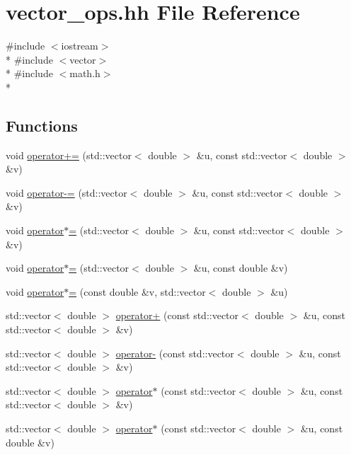 \hypertarget{vector__ops_8hh}{\section{vector\-\_\-ops.\-hh File Reference}
\label{vector__ops_8hh}
}
{\ttfamily \#include $<$iostream$>$}\\*
{\ttfamily \#include $<$vector$>$}\\*
{\ttfamily \#include $<$math.\-h$>$}\\*
\subsection*{Functions}
\begin{DoxyCompactItemize}
\item 
void \hyperlink{vector__ops_8hh_adbc42bb6b72e7c57f961c77a042a9bff}{operator+=} (std\-::vector$<$ double $>$ \&u, const std\-::vector$<$ double $>$ \&v)
\item 
void \hyperlink{vector__ops_8hh_a6576381ebb1e650c757cee7003ec0468}{operator-\/=} (std\-::vector$<$ double $>$ \&u, const std\-::vector$<$ double $>$ \&v)
\item 
void \hyperlink{vector__ops_8hh_a13f188d3447fc14483c89d2e06f42593}{operator$\ast$=} (std\-::vector$<$ double $>$ \&u, const std\-::vector$<$ double $>$ \&v)
\item 
void \hyperlink{vector__ops_8hh_a7021d82502a83b43c2f507a185140c73}{operator$\ast$=} (std\-::vector$<$ double $>$ \&u, const double \&v)
\item 
void \hyperlink{vector__ops_8hh_ae5b19f02d09ffff2d2946aef833a7e5b}{operator$\ast$=} (const double \&v, std\-::vector$<$ double $>$ \&u)
\item 
std\-::vector$<$ double $>$ \hyperlink{vector__ops_8hh_adf96f73578c30d6bac57c6d86e7b1228}{operator+} (const std\-::vector$<$ double $>$ \&u, const std\-::vector$<$ double $>$ \&v)
\item 
std\-::vector$<$ double $>$ \hyperlink{vector__ops_8hh_af711199d09ab5891151290b824e3e967}{operator-\/} (const std\-::vector$<$ double $>$ \&u, const std\-::vector$<$ double $>$ \&v)
\item 
std\-::vector$<$ double $>$ \hyperlink{vector__ops_8hh_aa44eb5f612712ab822ca4c9dd6651430}{operator$\ast$} (const std\-::vector$<$ double $>$ \&u, const std\-::vector$<$ double $>$ \&v)
\item 
std\-::vector$<$ double $>$ \hyperlink{vector__ops_8hh_a5beadfe391c5fd61691c3903a72c10e7}{operator$\ast$} (const std\-::vector$<$ double $>$ \&u, const double \&v)

\end{DoxyCompactItemize}
